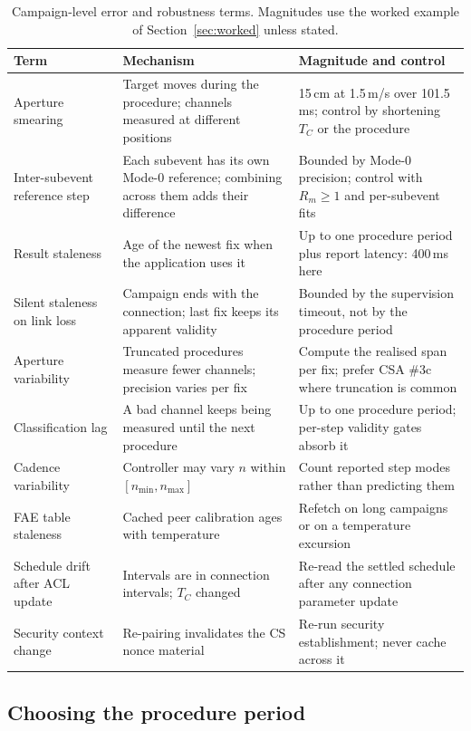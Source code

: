 \documentclass[11pt,a4paper]{article}
\newcommand{\Tconn}{T_{C}}
\begin{document}
\begin{table}[htb]
\caption{Campaign-level error and robustness terms. Magnitudes use the worked example of
Section~\ref{sec:worked} unless stated.}
\label{tab:errors}
\centering\small
\begin{tabular}{@{}L{34mm}L{54mm}L{42mm}@{}}
\toprule
Term & Mechanism & Magnitude and control \\
\midrule
Aperture smearing
  & Target moves during the procedure; channels measured at different positions
  & 15\,cm at 1.5\,m/s over 101.5\,ms; control by shortening $\Tconn$ or the procedure \\
Inter-subevent reference step
  & Each subevent has its own Mode-0 reference; combining across them adds their difference
  & Bounded by Mode-0 precision; control with $R_m \ge 1$ and per-subevent fits \\
Result staleness
  & Age of the newest fix when the application uses it
  & Up to one procedure period plus report latency: 400\,ms here \\
Silent staleness on link loss
  & Campaign ends with the connection; last fix keeps its apparent validity
  & Bounded by the supervision timeout, not by the procedure period \\
Aperture variability
  & Truncated procedures measure fewer channels; precision varies per fix
  & Compute the realised span per fix; prefer CSA \#3c where truncation is common \\
Classification lag
  & A bad channel keeps being measured until the next procedure
  & Up to one procedure period; per-step validity gates absorb it \\
Cadence variability
  & Controller may vary $n$ within $[n_{\min},n_{\max}]$
  & Count reported step modes rather than predicting them \\
FAE table staleness
  & Cached peer calibration ages with temperature
  & Refetch on long campaigns or on a temperature excursion \\
Schedule drift after ACL update
  & Intervals are in connection intervals; $\Tconn$ changed
  & Re-read the settled schedule after any connection parameter update \\
Security context change
  & Re-pairing invalidates the CS nonce material
  & Re-run security establishment; never cache across it \\
\bottomrule
\end{tabular}
\end{table}

\subsection{Choosing the procedure period}
\end{document}
